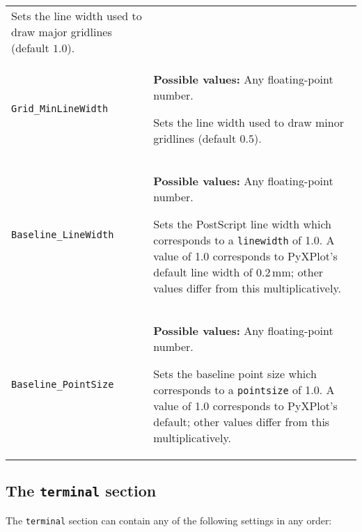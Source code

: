 \begin{longtable}{p{3.4cm}p{9cm}}
               Sets the line width used to draw major gridlines (default $1.0$).
               \\
{\tt Grid\_MinLineWidth} & {\bf Possible values:} Any floating-point number.

               Sets the line width used to draw minor gridlines (default $0.5$).
               \\
{\tt Baseline\_LineWidth} & {\bf Possible values:} Any floating-point number.

               Sets the PostScript line width which corresponds to a {\tt linewidth} of 1.0. A value of 1.0 corresponds to PyXPlot's default line width of $0.2\,\mathrm{mm}$; other values differ from this multiplicatively.
               \\
{\tt Baseline\_PointSize} & {\bf Possible values:} Any floating-point number.

               Sets the baseline point size which corresponds to a {\tt pointsize} of 1.0. A value of 1.0 corresponds to PyXPlot's default; other values differ from this multiplicatively.
               \\
\end{longtable}

\subsection{The {\tt terminal} section}
\label{sec:configfile_terminal}

The {\tt terminal} section can contain any of the following settings in any order:

